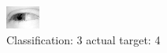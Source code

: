 \begin{figure}[h!]
\begin{center}
\includegraphics[width=0.60\columnwidth]{figures/ID2470_class_3_target_4.png}
\end{center}
\caption{ Classification: 3 actual target: 4}
\label{fig:ID2470_class_3_target_4}
\end{figure}

